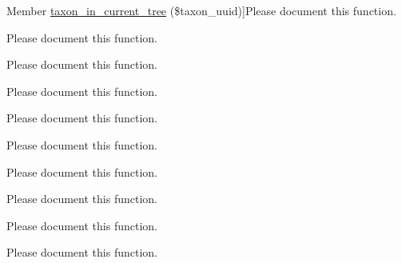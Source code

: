 \begin{DoxyRefList}
\hypertarget{todo__todo000122}{}%
Member \hyperlink{cdm__dataportal_8common_8theme_aa57a44943827ba930031005b2395ba6a}{taxon\-\_\-in\-\_\-current\-\_\-tree} (\$taxon\-\_\-uuid)]Please document this function.  
\item[\label{todo__todo000194}%
\hypertarget{todo__todo000194}{}%
Member \hyperlink{cdm__dataportal_8taxon_8theme_aecad6778986483e773d5c31a615ed4ff}{theme\-\_\-cdm\-\_\-accepted\-For} ()]Please document this function.  
\item[\label{todo__todo000125}%
\hypertarget{todo__todo000125}{}%
Member \hyperlink{cdm__dataportal_8common_8theme_a00f4ad9c55f3132e95baf64a4ac474b3}{theme\-\_\-cdm\-\_\-annotation\-\_\-content} (\$variables)]Please document this function.  
\item[\label{todo__todo000124}%
\hypertarget{todo__todo000124}{}%
Member \hyperlink{cdm__dataportal_8common_8theme_a4766d9e6471d3f8fe26aa5c4c595dec9}{theme\-\_\-cdm\-\_\-annotation\-\_\-footnotes} (\$variables)]Please document this function.  
\item[\label{todo__todo000130}%
\hypertarget{todo__todo000130}{}%
Member \hyperlink{cdm__dataportal_8common_8theme_afa44c06d555fd7bbc27fa34d0639c17a}{theme\-\_\-cdm\-\_\-annotations} (\$variables)]Please document this function.  
\item[\label{todo__todo000136}%
\hypertarget{todo__todo000136}{}%
Member \hyperlink{cdm__dataportal_8common_8theme_ad30406dae55dde9bc88b90f6f1fb8724}{theme\-\_\-cdm\-\_\-back\-\_\-to\-\_\-image\-\_\-gallery\-\_\-button} ()]Please document this function.  
\item[\label{todo__todo000135}%
\hypertarget{todo__todo000135}{}%
Member \hyperlink{cdm__dataportal_8common_8theme_a35bcfe70942b7d783c6744e6d73502ca}{theme\-\_\-cdm\-\_\-back\-\_\-to\-\_\-search\-\_\-result\-\_\-button} ()]Please document this function.  
\item[\label{todo__todo000160}%
\hypertarget{todo__todo000160}{}%
Member \hyperlink{cdm__dataportal_8descriptions_8theme_a41b831811cde915e203f46cf1ce8b78b}{theme\-\_\-cdm\-\_\-block\-\_\-\-Identification\-Keys} (\$variables)]Please document this function.  
\item[\label{todo__todo000162}%
\hypertarget{todo__todo000162}{}%
Member \hyperlink{cdm__dataportal_8descriptions_8theme_ada5d580faa5cca625c83e7644380271c}{theme\-\_\-cdm\-\_\-block\-\_\-\-Uses} (\$variables)]Please document this function.  
\item[\label{todo__todo000149}%
\hypertarget{todo__todo000149}{}%
Member \hyperlink{cdm__dataportal_8descriptions_8theme_afee4cb1a5526e2af54aed8a9ebd41d41}{theme\-\_\-cdm\-\_\-common\-\_\-names} (\$variables)]Please document this function.  

\end{DoxyRefList}
